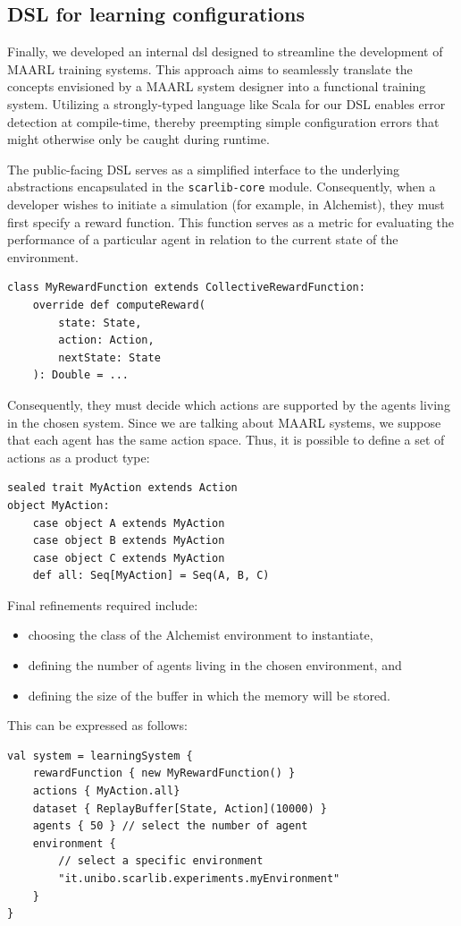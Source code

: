 \subsection{DSL for learning configurations} 
Finally, we developed an internal \ac{dsl} designed to streamline the development of \ac{MAARL} training systems. 
 This approach aims to seamlessly translate the concepts envisioned by a \ac{MAARL} system designer into a functional training system. 
 Utilizing a strongly-typed language like Scala for our DSL enables error detection at compile-time, 
 thereby preempting simple configuration errors that might otherwise only be caught during runtime.

The public-facing DSL serves as a simplified interface to the underlying abstractions encapsulated in the \texttt{scarlib-core} module. 
 Consequently, when a developer wishes to initiate a simulation 
 (for example, in Alchemist), 
 they must first specify a reward function. 
 This function serves as a metric for evaluating the performance of a particular agent in relation to the current state of the environment.

\begin{lstlisting}
class MyRewardFunction extends CollectiveRewardFunction:
    override def computeReward(
        state: State, 
        action: Action, 
        nextState: State
    ): Double = ...
\end{lstlisting}
Consequently, they must decide which actions are supported 
 by the agents living in the chosen system. 
%
Since we are talking about \ac{MAARL} systems, 
 we suppose that each agent has the same action space. 
 Thus, it is possible to define a set of actions as a product type:
\begin{lstlisting}
sealed trait MyAction extends Action
object MyAction:
    case object A extends MyAction
    case object B extends MyAction
    case object C extends MyAction
    def all: Seq[MyAction] = Seq(A, B, C)
\end{lstlisting}
Final refinements required include: 
\begin{itemize}
    \item choosing the class of the Alchemist environment to instantiate, 
    \item defining the number of agents living in the chosen environment, and 
    \item defining the size of the buffer in which the memory will be stored.
\end{itemize}
This can be expressed as follows:
\begin{lstlisting}
val system = learningSystem {
    rewardFunction { new MyRewardFunction() }
    actions { MyAction.all}
    dataset { ReplayBuffer[State, Action](10000) }
    agents { 50 } // select the number of agent
    environment {
        // select a specific environment
        "it.unibo.scarlib.experiments.myEnvironment"
    }
}
\end{lstlisting}

